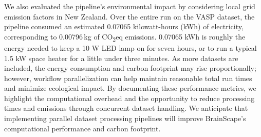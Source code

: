 We also evaluated the pipeline's environmental impact by considering local grid emission factors in New Zealand. 
Over the entire run on the VASP dataset, the pipeline consumed an estimated 0.07065 kilowatt-hours (kWh) of electricity, corresponding to 
0.00796\,kg of CO\textsubscript{2}eq emissions. 
0.07065 kWh is roughly the energy needed to keep a 10 W LED lamp on for seven hours, 
or to run a typical 1.5 kW space heater for a little under three minutes.
As more datasets are included, the energy consumption and 
carbon footprint may rise proportionally; however, workflow parallelization can help maintain 
reasonable total run times and minimize ecological impact. By documenting these performance metrics, we highlight 
the computational overhead and the opportunity to reduce processing times and emissions through concurrent dataset handling. 
We anticipate that implementing parallel dataset processing pipelines will improve BrainScape's computational performance and carbon footprint.
